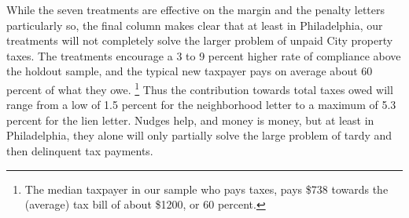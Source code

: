 \documentclass[12pt]{article}
\begin{document}
While the seven treatments are effective on the margin and the penalty
letters particularly so, the final column makes clear that at least in
Philadelphia, our treatments will not completely solve the larger
problem of unpaid City property taxes.  The treatments encourage a 3
to 9 percent higher rate of compliance above the holdout sample, and
the typical new taxpayer pays on average about 60 percent of what they
owe. \footnote{The median taxpayer in our sample who pays taxes,
  pays \$738 towards the (average) tax bill of about \$1200, or 60
  percent.}  Thus the contribution towards total taxes owed will range
from a low of 1.5 percent for the neighborhood letter to a maximum of
5.3 percent for the lien letter.  Nudges help, and money is money, but
at least in Philadelphia, they alone will only partially solve the large problem
of tardy and then delinquent tax payments.
\end{document}
